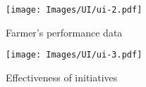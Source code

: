 
\begin{figure}[H]
	\centering
    \texttt{[image: Images/UI/ui-2.pdf]}
	\caption{\label{fig:bpmn_sign_up}Farmer's performance data}
\end{figure}

\begin{figure}[H]
	\centering
    \texttt{[image: Images/UI/ui-3.pdf]}
	\caption{\label{fig:bpmn_sign_up}Effectiveness of initiatives}
\end{figure}
